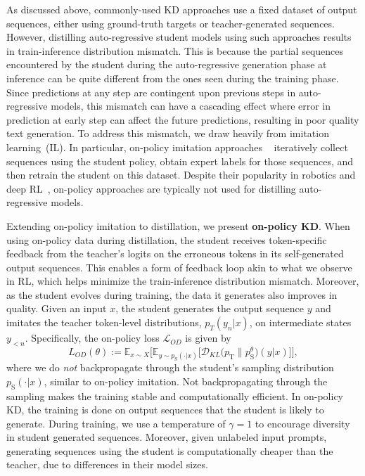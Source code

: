 \documentclass{article} %
\newcommand{\E}{\mathbb{E}}
\newcommand{\KL}{D_{\mathrm{KL}}}
\def\L{\mathcal{L}}
\def\KL{\mathcal{D}_{KL}}
\newcommand{\stu}[0]{p_{\text{S}}}
\newcommand{\tea}[0]{p_{\text{T}}}
\newcommand{\revise}[1]{#1}
\newcommand{\addtext}[1]{#1}
\begin{document}
As discussed above, commonly-used KD approaches use a fixed dataset of output sequences, either using ground-truth targets or teacher-generated sequences. However, distilling auto-regressive student models using such approaches results in train-\revise{inference} distribution mismatch. This is because the partial sequences encountered by the student during the auto-regressive generation phase at inference can be quite different from the ones seen during the training phase. Since predictions at any step are contingent upon previous steps in auto-regressive models, this mismatch can have a cascading effect where error in prediction at early step can affect the future predictions, resulting in poor quality text generation. To address this mismatch, we draw heavily from imitation learning~(IL). In particular, on-policy imitation approaches ~\citep[\emph{e.g.}][]{ross2011reduction}  iteratively collect sequences using the student policy, obtain expert labels for those sequences, and then retrain the student on this dataset. Despite their popularity \revise{in robotics and deep RL}~\citep{parisotto2015actor, kelly2019hg, agarwal2022reincarnating}, on-policy approaches are typically not used for distilling auto-regressive models. 

Extending on-policy imitation to distillation, we present \textbf{on-policy KD}.  \addtext{When using  on-policy data during distillation, the student receives token-specific feedback from the teacher's logits on the erroneous tokens in its self-generated output sequences. This enables a form of feedback loop akin to what we observe in RL, which helps minimize the train-inference distribution mismatch. Moreover, as the student evolves during training, the data it generates also improves in quality}. Given an input $x$, the student generates the output sequence $y$ and imitates the teacher token-level distributions, $p_T(y_n | x)$, on intermediate states $y_{<n}$. Specifically, the on-policy loss $\L_{OD}$ is given by
\begin{equation}
L_{OD}(\theta) := \E_{x \sim X} \Big[\E_{y \sim \stu(\cdot|x)} \big[\KL\big(\tea \| \stu^\theta\big)(y|x)\big] \Big],
\label{eq:on_d}
\end{equation}
where we do \emph{not} backpropagate through the student's sampling distribution $\stu(\cdot|x)$, similar to on-policy imitation. Not backpropagating through the sampling makes the training stable and computationally efficient. In on-policy KD, the training is done on output sequences that the student is likely to generate. During training, we use a temperature of $\gamma = 1$ to encourage diversity in student generated sequences. Moreover, given unlabeled input prompts, generating sequences using the student is computationally cheaper than the teacher, due to differences in their model sizes. 
\end{document}
